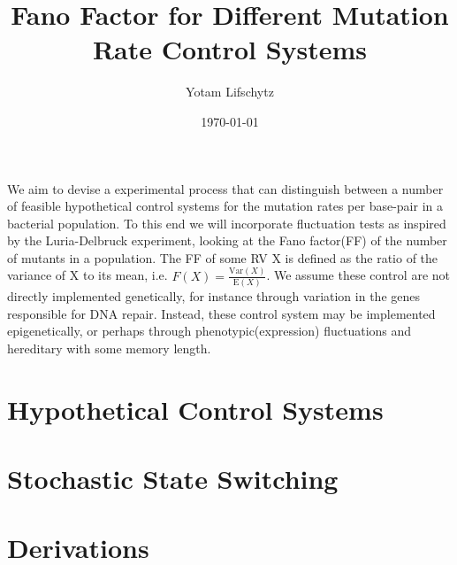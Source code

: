 \documentclass{article}
\title{\textbf{Fano Factor for Different Mutation Rate Control Systems}}
\date{\today}
\author{Yotam Lifschytz}
\begin{document}
\maketitle

We aim to devise a experimental process that can distinguish between a number of feasible hypothetical control systems for the mutation rates per base-pair in a bacterial population.
To this end we will incorporate fluctuation tests as inspired by the Luria-Delbruck experiment, looking at the Fano factor(FF) of the number of mutants in a population.
The FF of some RV X is defined as the ratio of the variance of X to its mean, i.e. $F(X) = \frac{\text{Var}(X)}{\text{E}(X)}$.
We assume these control are not directly implemented genetically, for instance through variation in the genes responsible for DNA repair.
Instead, these control system may be implemented epigenetically, or perhaps through phenotypic(expression) fluctuations and hereditary with some memory length.

\section{Hypothetical Control Systems}\label{sec:hypothetical-control-systems}


\section{Stochastic State Switching}\label{sec:sss}


\section{Derivations}\label{sec:derivations}

\end{document}
